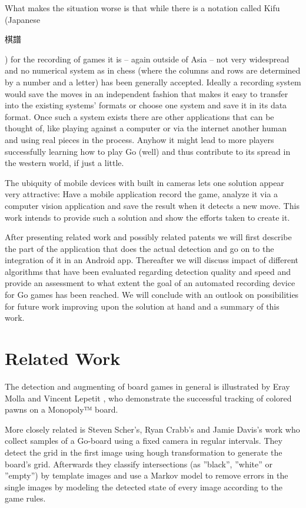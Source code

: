 	What makes the situation worse is that while there is a notation called Kifu (Japanese \begingroup\setmainfont{Droid Sans Japanese}\small\begin{CJK}{UTF8}{min}棋譜\end{CJK}\endgroup ) for the recording of games it is -- again outside of Asia -- not very widespread and no numerical system as in chess (where the columns and rows are determined by a number and a letter) has been generally accepted. Ideally a recording system would save the moves in an independent fashion that makes it easy to transfer into the existing systems' formats or choose one system and save it in its data format. Once such a system exists there are other applications that can be thought of, like playing against a computer or via the internet another human and using real pieces in the process. Anyhow it might lead to more players successfully learning how to play Go (well) and thus contribute to its spread in the western world, if just a little. %

	The ubiquity of mobile devices with built in cameras lets one solution appear very attractive: Have a mobile application record the game, analyze it via a computer vision application and save the result when it detects a new move. This	work intends to provide such a solution and show the efforts taken to create it.

	After presenting related work and possibly related patents we will first describe the part of the application that does the actual detection and go on to the integration of it in an Android app. Thereafter we will discuss impact of different algorithms that have been evaluated regarding detection quality and speed and provide an assessment to what extent the goal of an automated recording device for Go games has been reached. We will conclude with an outlook on possibilities for future work improving upon the solution at hand and a summary of this work.


	\section{Related Work}
	\label{introduction-work}
	The detection and augmenting of board games in general is illustrated by Eray Molla and Vincent Lepetit \cite{molla2010augmented}, who demonstrate the successful tracking of colored pawns on a Monopoly™ board.

	More closely related is  Steven Scher's, Ryan Crabb's and Jamie Davis's work \cite{scher2008making} who collect samples of a Go-board using a fixed camera in regular intervals. They detect the grid in the first image using hough transformation to generate the board's grid. Afterwards they classify intersections (as ''black'', ''white'' or ''empty'') by template images and use a Markov model to remove errors in the single images by modeling the detected state of every image according to the game rules.

